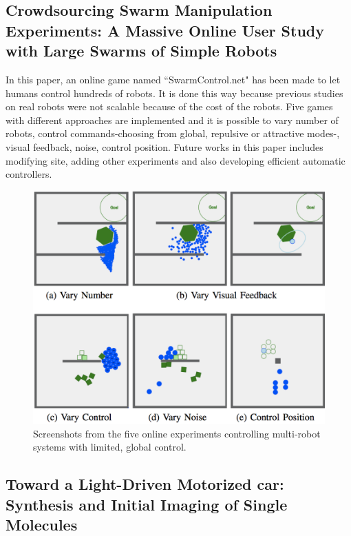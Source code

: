 \documentclass[letterpaper, 10 pt, conference]{ieeeconf}
\begin{document}
\subsection{Crowdsourcing Swarm Manipulation Experiments: A Massive Online User Study with Large Swarms of Simple Robots}

In this paper, an online game named ``SwarmControl.net" has been made to let humans control hundreds of robots.\cite{swarmcontrol2013} It is done this way because previous studies on real robots were not scalable because of the cost of the robots. Five games with different approaches are implemented and it is possible to vary number of robots, control commands-choosing from global, repulsive or attractive modes-, visual feedback, noise, control position. Future works in this paper includes modifying site, adding other experiments and also developing efficient automatic controllers.
\begin{figure}[h]
\begin{center}
\includegraphics[width=\columnwidth]{SwarmBecker.png}
\caption{Screenshots from the five online experiments controlling multi-robot systems with limited, global control.\cite{swarmcontrol2013}
\label{fig:swarmcontrol.net}}
\end{center}
\end{figure} 

\subsection{Toward a Light-Driven Motorized 
 car: Synthesis and Initial Imaging of Single Molecules}
\end{document}
